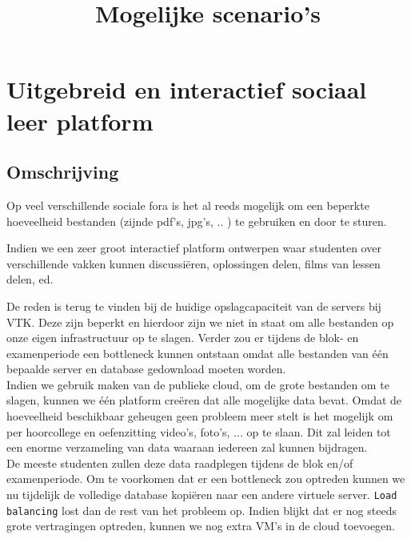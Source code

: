 \documentclass{article}
\title{Mogelijke scenario's}
\begin{document}
\section{Uitgebreid en interactief sociaal leer platform }
\subsection{Omschrijving}

Op veel verschillende sociale fora is het al reeds mogelijk om een beperkte hoeveelheid bestanden (zijnde pdf's, jpg's, .. ) te gebruiken en door te sturen.  

Indien we een zeer groot interactief platform ontwerpen waar studenten over verschillende vakken kunnen discussiëren, oplossingen delen, films van lessen delen, ed.


De reden is terug te vinden bij de huidige opslagcapaciteit van de servers bij VTK. Deze zijn beperkt en hierdoor zijn we niet in staat om alle bestanden op onze eigen infrastructuur op te slagen.  Verder zou er tijdens de blok- en examenperiode een bottleneck kunnen ontstaan omdat alle bestanden van één bepaalde server en database gedownload moeten worden. \\

Indien we gebruik maken van de publieke cloud, om de grote bestanden om te slagen, kunnen we één platform creëren dat alle mogelijke data bevat.  Omdat de hoeveelheid beschikbaar geheugen geen probleem meer stelt is het mogelijk om per hoorcollege en oefenzitting video's, foto's, ... op te slaan.  Dit zal leiden tot een enorme verzameling van data waaraan iedereen zal kunnen bijdragen.\\

De meeste studenten zullen deze data raadplegen tijdens de blok en/of examenperiode.  Om te voorkomen dat er een bottleneck zou optreden kunnen we nu tijdelijk de volledige database kopiëren naar een andere virtuele server.  \texttt{Load balancing} lost dan de rest van het probleem op.  Indien blijkt dat er nog steeds grote vertragingen optreden, kunnen we nog extra VM's in de cloud toevoegen.\\
\end{document}
